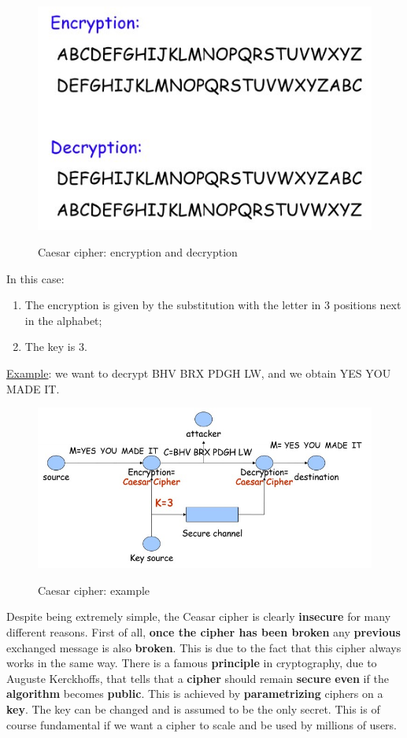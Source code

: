 \begin{figure}[h!]
        \centering
        \includegraphics[scale = 1.2]{img/cl4.jpg}
        \label{cl4}
        \caption{Caesar cipher: encryption and decryption}
\end{figure}

In this case:

\begin{enumerate}
    \item The encryption is given by the substitution with the letter in 3 positions next in the alphabet;
    \item The key is 3.
\end{enumerate}

\underline{Example}: we want to decrypt BHV BRX PDGH LW, and we obtain YES YOU MADE IT.

\begin{figure}[h!]
        \centering
        \includegraphics[scale = 1.2]{img/cl5.jpg}
        \label{cl5}
        \caption{Caesar cipher: example}
\end{figure}

Despite being extremely simple, the Ceasar cipher is clearly \textbf{insecure} for many different reasons. First of all, \textbf{once the cipher has been broken} any \textbf{previous} exchanged message is also \textbf{broken}. This is due to the fact that this cipher always works in the same way. There is a famous \textbf{principle} in cryptography, due to Auguste Kerckhoffs, that tells that a \textbf{cipher} should remain \textbf{secure} \textbf{even} if the \textbf{algorithm} becomes \textbf{public}. This is achieved by \textbf{parametrizing} ciphers on a \textbf{key}. The key can be changed and is assumed to be the only secret. This is of course fundamental if we want a cipher to scale and be used by millions of users.


